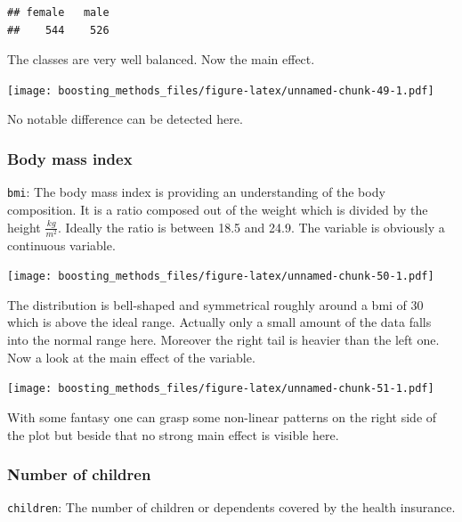 \documentclass[
]{book}
\newenvironment{Shaded}{\begin{snugshade}}{\end{snugshade}}
\newcommand{\FunctionTok}[1]{\textcolor[rgb]{0.00,0.00,0.00}{#1}}
\newcommand{\NormalTok}[1]{#1}
\newcommand{\SpecialCharTok}[1]{\textcolor[rgb]{0.00,0.00,0.00}{#1}}
\begin{document}
\begin{Shaded}
\end{Shaded}

\begin{verbatim}
## female   male 
##    544    526
\end{verbatim}

The classes are very well balanced. Now the main effect.

\texttt{[image: boosting\_methods\_files/figure-latex/unnamed-chunk-49-1.pdf]}

No notable difference can be detected here.

\hypertarget{body-mass-index}{%
\subsubsection{Body mass index}\label{body-mass-index}}

\texttt{bmi}: The body mass index is providing an understanding of the body composition. It is a ratio composed out of the weight which is divided by the height \(\frac{kg}{m^2}\). Ideally the ratio is between 18.5 and 24.9. The variable is obviously a continuous variable.

\texttt{[image: boosting\_methods\_files/figure-latex/unnamed-chunk-50-1.pdf]}

The distribution is bell-shaped and symmetrical roughly around a bmi of 30 which is above the ideal range. Actually only a small amount of the data falls into the normal range here. Moreover the right tail is heavier than the left one. Now a look at the main effect of the variable.

\texttt{[image: boosting\_methods\_files/figure-latex/unnamed-chunk-51-1.pdf]}

With some fantasy one can grasp some non-linear patterns on the right side of the plot but beside that no strong main effect is visible here.

\hypertarget{number-of-children}{%
\subsubsection{Number of children}\label{number-of-children}}

\texttt{children}: The number of children or dependents covered by the health insurance.
\end{document}
